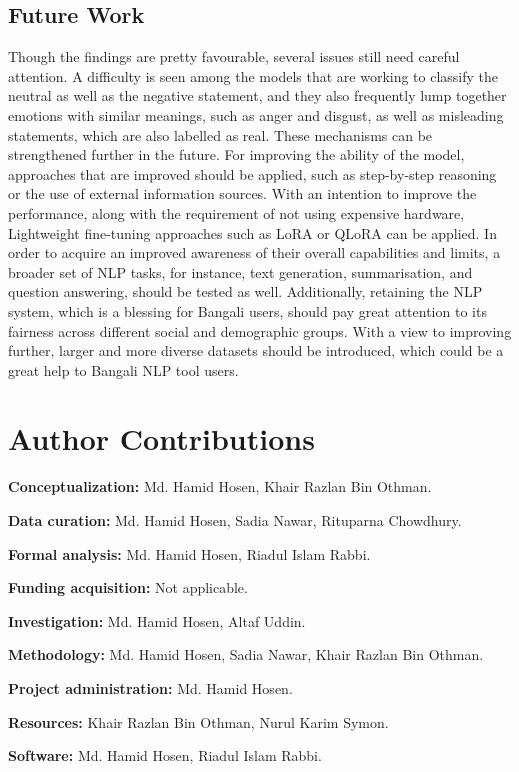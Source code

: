 \documentclass[10pt,letterpaper]{article}
\begin{document}
\subsection*{Future Work}
Though the findings are pretty favourable, several issues still need careful attention. A difficulty is seen among the models that are working to classify the neutral as well as the negative statement, and they also frequently lump together emotions with similar meanings, such as anger and disgust, as well as misleading statements, which are also labelled as real. These mechanisms can be strengthened further in the future. For improving the ability of the model, approaches that are improved should be applied, such as step-by-step reasoning or the use of external information sources. With an intention to improve the performance, along with the requirement of not using expensive hardware, Lightweight fine-tuning approaches such as LoRA or QLoRA can be applied. In order to acquire an improved awareness of their overall capabilities and limits, a broader set of NLP tasks, for instance, text generation, summarisation, and question answering, should be tested as well. Additionally, retaining the NLP system, which is a blessing for Bangali users, should pay great attention to its fairness across different social and demographic groups. With a view to improving further, larger and more diverse datasets should be introduced, which could be a great help to Bangali NLP tool users.

\section*{Author Contributions}

\textbf{Conceptualization:} Md. Hamid Hosen, Khair Razlan Bin Othman.

\textbf{Data curation:} Md. Hamid Hosen, Sadia Nawar, Rituparna Chowdhury.

\textbf{Formal analysis:} Md. Hamid Hosen, Riadul Islam Rabbi.

\textbf{Funding acquisition:} Not applicable.

\textbf{Investigation:} Md. Hamid Hosen, Altaf Uddin.

\textbf{Methodology:} Md. Hamid Hosen, Sadia Nawar, Khair Razlan Bin Othman.

\textbf{Project administration:} Md. Hamid Hosen.

\textbf{Resources:} Khair Razlan Bin Othman, Nurul Karim Symon.

\textbf{Software:} Md. Hamid Hosen, Riadul Islam Rabbi.
\end{document}
